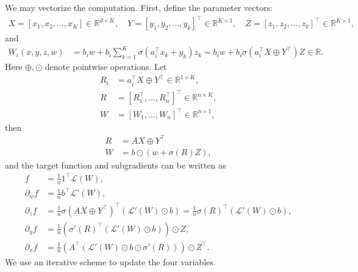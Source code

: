 \documentclass{article}
\numberwithin{equation}{section}
\numberwithin{figure}{section}
\begin{document}
We may vectorize the computation. First, define the parameter vectors:
\begin{equation}
\begin{aligned}
X = [x_1, x_2, \hdots, x_K] \in\mathbb{R}^{d\times K}, \quad Y = [y_1, y_2, \hdots, y_k]^\top \in\mathbb{R}^{K\times 1}, \quad Z = [z_1, z_2, \hdots, z_k]^\top \in\mathbb{R}^{K\times 1},
\end{aligned}
\end{equation}
and
\begin{equation}
\begin{aligned}
W_i(x, y, z, w) &= b_iw+b_i\sum_{k=1}^{K}\sigma(a_i^\top x_k+y_k)z_k = b_i w + b_i \sigma(a_i^\top X \oplus Y^\top) Z \in \mathbb{R}.
\end{aligned}
\end{equation}
Here $\oplus, \odot$ denote pointwise operations. Let
\begin{equation}
\begin{aligned}
R_i &= a_i^\top X\oplus Y^\top \in \mathbb{R}^{1\times K}, \\
R &= [R_1^\top, \hdots, R_n^\top]^\top \in \mathbb{R}^{n\times K}, \\
W &= [W_1, \hdots, W_n]^\top \in \mathbb{R}^{n\times 1},
\end{aligned}
\end{equation}
then
\begin{equation}
\begin{aligned}
R &= AX\oplus Y^\top \\
W &= b\odot (w+\sigma(R)Z),
\end{aligned}
\end{equation}
and the target function and subgradients can be written as 
\begin{equation}
\begin{aligned}
f &= \frac{1}{n} 1^\top \mathcal{L}(W), \\
\partial_w f &= \frac{1}{n} b^\top \mathcal{L}'(W) , \\
\partial_z f &= \frac{1}{n} \sigma(AX\oplus Y^\top)^\top (\mathcal{L}'(W)\odot b) = \frac{1}{n} \sigma(R)^\top (\mathcal{L}'(W)\odot b), \\
\partial_y f &= \frac{1}{n} (\sigma'(R)^\top (\mathcal{L}'(W)\odot b)) \odot Z, \\
\partial_x f &= \frac{1}{n} (A^\top (\mathcal{L}'(W)\odot b \odot \sigma'(R)))\odot Z^\top.
\end{aligned}
\end{equation}
We use an iterative scheme to update the four variables.
\end{document}
